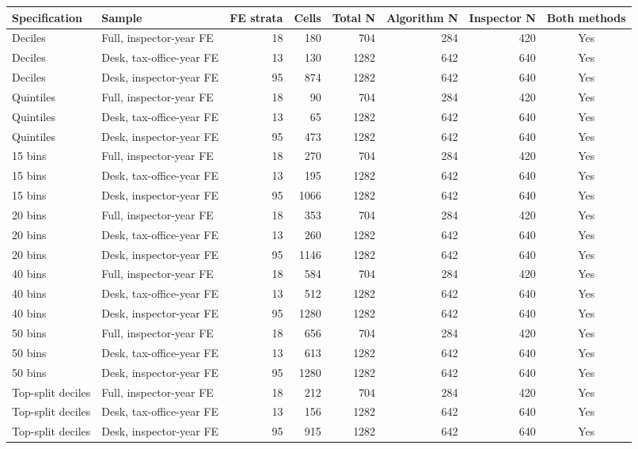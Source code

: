 \begin{tabular}{llrrrrrc}
\toprule
Specification & Sample & FE strata & Cells & Total N & Algorithm N & Inspector N & Both methods \\
\midrule
Deciles & Full, inspector-year FE & 18 & 180 & 704 & 284 & 420 & Yes \\
Deciles & Desk, tax-office-year FE & 13 & 130 & 1282 & 642 & 640 & Yes \\
Deciles & Desk, inspector-year FE & 95 & 874 & 1282 & 642 & 640 & Yes \\
Quintiles & Full, inspector-year FE & 18 & 90 & 704 & 284 & 420 & Yes \\
Quintiles & Desk, tax-office-year FE & 13 & 65 & 1282 & 642 & 640 & Yes \\
Quintiles & Desk, inspector-year FE & 95 & 473 & 1282 & 642 & 640 & Yes \\
15 bins & Full, inspector-year FE & 18 & 270 & 704 & 284 & 420 & Yes \\
15 bins & Desk, tax-office-year FE & 13 & 195 & 1282 & 642 & 640 & Yes \\
15 bins & Desk, inspector-year FE & 95 & 1066 & 1282 & 642 & 640 & Yes \\
20 bins & Full, inspector-year FE & 18 & 353 & 704 & 284 & 420 & Yes \\
20 bins & Desk, tax-office-year FE & 13 & 260 & 1282 & 642 & 640 & Yes \\
20 bins & Desk, inspector-year FE & 95 & 1146 & 1282 & 642 & 640 & Yes \\
40 bins & Full, inspector-year FE & 18 & 584 & 704 & 284 & 420 & Yes \\
40 bins & Desk, tax-office-year FE & 13 & 512 & 1282 & 642 & 640 & Yes \\
40 bins & Desk, inspector-year FE & 95 & 1280 & 1282 & 642 & 640 & Yes \\
50 bins & Full, inspector-year FE & 18 & 656 & 704 & 284 & 420 & Yes \\
50 bins & Desk, tax-office-year FE & 13 & 613 & 1282 & 642 & 640 & Yes \\
50 bins & Desk, inspector-year FE & 95 & 1280 & 1282 & 642 & 640 & Yes \\
Top-split deciles & Full, inspector-year FE & 18 & 212 & 704 & 284 & 420 & Yes \\
Top-split deciles & Desk, tax-office-year FE & 13 & 156 & 1282 & 642 & 640 & Yes \\
Top-split deciles & Desk, inspector-year FE & 95 & 915 & 1282 & 642 & 640 & Yes \\
\bottomrule
\end{tabular}
